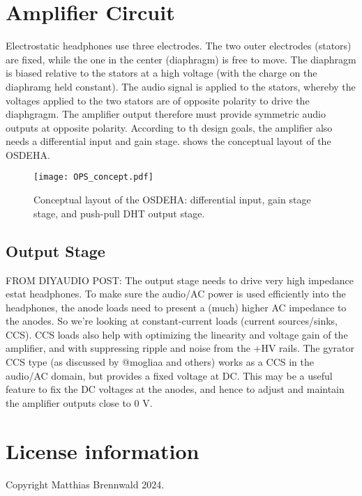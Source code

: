 \section{Amplifier Circuit}

Electrostatic headphones use three electrodes. The two outer electrodes (stators) are fixed, while the one in the center (diaphragm) is free to move. The diaphragm is biased relative to the stators at a high voltage (with the charge on the diaphramg held constant). The audio signal is applied to the stators, whereby the voltages applied to the two stators are of opposite polarity to drive the diaphgragm. The amplifier output therefore must provide symmetric audio outputs at opposite polarity. According to th design goals, the amplifier also needs a differential input and gain stage.  shows the conceptual layout of the OSDEHA.

\begin{figure}
\begin{center}
\texttt{[image: OPS\_concept.pdf]}
\caption{Conceptual layout of the OSDEHA: differential input, gain stage stage, and push-pull DHT output stage.}
\end{center}
\end{figure}


\subsection{Output Stage}
FROM DIYAUDIO POST:
    The output stage needs to drive very high impedance estat headphones. To make sure the audio/AC power is used efficiently into the headphones, the anode loads need to present a (much) higher AC impedance to the anodes. So we're looking at constant-current loads (current sources/sinks, CCS). CCS loads also help with optimizing the linearity and voltage gain of the amplifier, and with suppressing ripple and noise from the +HV rails.
    The gyrator CCS type (as discussed by @mogliaa and others) works as a CCS in the audio/AC domain, but provides a fixed voltage at DC. This may be a useful feature to fix the DC voltages at the anodes, and hence to adjust and maintain the amplifier outputs close to 0 V.


\section{License information} 
Copyright Matthias Brennwald 2024.                                                    

